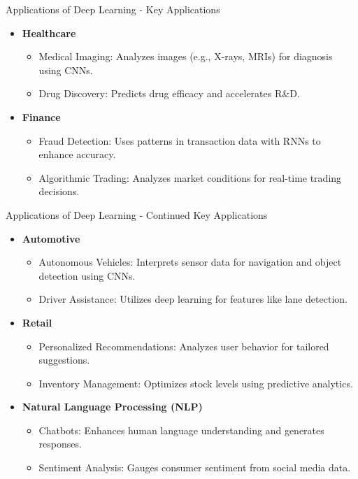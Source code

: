 \documentclass[aspectratio=169]{beamer}
\begin{document}
\begin{frame}[fragile]{Applications of Deep Learning - Key Applications}
    \begin{itemize}
        \item \textbf{Healthcare}
            \begin{itemize}
                \item Medical Imaging: Analyzes images (e.g., X-rays, MRIs) for diagnosis using CNNs.
                \item Drug Discovery: Predicts drug efficacy and accelerates R\&D.
            \end{itemize}
        \item \textbf{Finance}
            \begin{itemize}
                \item Fraud Detection: Uses patterns in transaction data with RNNs to enhance accuracy.
                \item Algorithmic Trading: Analyzes market conditions for real-time trading decisions.
            \end{itemize}
    \end{itemize}
\end{frame}

\begin{frame}[fragile]{Applications of Deep Learning - Continued Key Applications}
    \begin{itemize}
        \item \textbf{Automotive}
            \begin{itemize}
                \item Autonomous Vehicles: Interprets sensor data for navigation and object detection using CNNs.
                \item Driver Assistance: Utilizes deep learning for features like lane detection.
            \end{itemize}
        \item \textbf{Retail}
            \begin{itemize}
                \item Personalized Recommendations: Analyzes user behavior for tailored suggestions.
                \item Inventory Management: Optimizes stock levels using predictive analytics.
            \end{itemize}
        \item \textbf{Natural Language Processing (NLP)}
            \begin{itemize}
                \item Chatbots: Enhances human language understanding and generates responses.
                \item Sentiment Analysis: Gauges consumer sentiment from social media data.
            \end{itemize}
    \end{itemize}
\end{frame}
\end{document}
